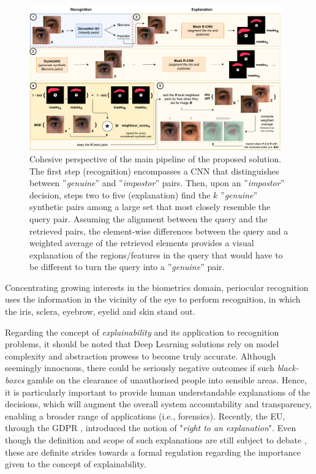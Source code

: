 \documentclass[final]{cvpr}
\begin{document}
\begin{figure}[h]
  \begin{center}
  \includegraphics[width=0.97\textwidth]{figures/figure_2.pdf}
  \caption{Cohesive perspective of the main pipeline of the proposed solution. The first step (recognition) encompasses a CNN that distinguishes between ''\textit{genuine}'' and ''\emph{impostor}'' pairs. Then, upon an ''\emph{impostor}'' decision, steps two to five (explanation) find the $k$ ''\textit{genuine}'' synthetic pairs among a large set that most closely resemble the query pair. Assuming the alignment between the query and the retrieved pairs, the element-wise differences between the query and a weighted average of the retrieved elements provides a visual explanation of the regions/features in the query that would have to be different to turn the query into a ''\textit{genuine}'' pair.}
  \label{fig:main_diagram}
  \end{center}
\end{figure}

Concentrating growing interests in the biometrics domain, periocular recognition uses the information in the vicinity of the eye to perform recognition, in which the iris, sclera, eyebrow, eyelid and skin stand out. 

Regarding the concept of \emph{explainability} and its application to recognition problems, it should be noted that Deep Learning solutions rely on model complexity and abstraction prowess to become truly accurate. Although seemingly innocuous, there could be seriously negative outcomes if such \emph{black-boxes} gamble on the clearance of unauthorised people into sensible areas. Hence, it is particularly important to provide human understandable explanations of the decisions, which will augment the overall system accountability and transparency, enabling a broader range of applications (i.e., forensics). Recently, the EU, through the GDPR \cite{gdpr}, introduced the notion of "\emph{right to an explanation}". Even though the definition and scope of such explanations are still subject to debate \cite{right_to_explanation}, these are definite strides towards a formal regulation regarding the importance given to the concept of explainability. \\
\end{document}
